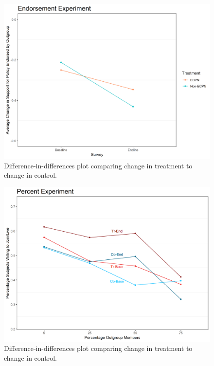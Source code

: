\documentclass[
]{article}
\begin{document}
\begin{figure}[H]
\centering
\includegraphics[width=\linewidth]{../data_and_code/survey_dat/figs/did_plots/finished_didPlots/endComm_plot.png}
\caption{Difference-in-differences plot comparing change in treatment to change in control.}\label{fig:end_comm}
\end{figure}

\begin{figure}[H]
\centering
\includegraphics[width=\linewidth]{../data_and_code/survey_dat/figs/did_plots/finished_didPlots/randComm_plot.png}
\caption{Difference-in-differences plot comparing change in treatment to change in control.}\label{fig:perc_comm}
\end{figure}
\end{document}
